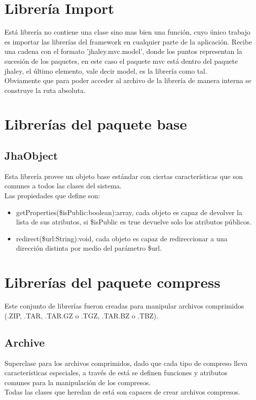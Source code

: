 \section{Librer\'ia Import}
Est\'a librer\'ia no contiene una clase sino mas bien una funci\'on, cuyo \'unico trabajo es importar las librer\'ias del framework en cualquier parte de la aplicaci\'on. Recibe una cadena con el formato \textsf{'jhaley.mvc.model'}, donde los puntos representan la sucesi\'on de los paquetes, en este caso el paquete \textsf{mvc} est\'a dentro del paquete \textsf{jhaley}, el \'ultimo elemento, vale decir \textsf{model}, es la librer\'ia como tal.\\
Obviamente que para poder acceder al archivo de la librer\'ia de manera interna se construye la ruta absoluta.

\section{Librer\'ias del paquete \textsf{base}}
\subsection{JhaObject}
Esta librer\'ia provee un objeto base est\'andar con ciertas caracter\'isticas que son comunes a todos las clases del sistema.\\Las propiedades que define son: 
\begin{itemize}
\item \textsf{getProperties(\$isPublic:boolean):array}, cada objeto es capaz de devolver la lista de sus atributos, si \textsf{\$isPublic} es \textsf{true} devuelve solo los atributos p\'ublicos.
\item \textsf{redirect(\$url:String):void}, cada objeto es capaz de redireccionar a una direcci\'on distinta por medio del par\'ametro \textsf{\$url}.
\end{itemize}

\section{Librer\'ias del paquete \textsf{compress}}
Este conjunto de librer\'ias fueron creadas para manipular archivos comprimidos (.ZIP, .TAR, .TAR.GZ o .TGZ, .TAR.BZ o .TBZ).
\subsection{Archive}
Superclase para los archivos comprimidos, dado que cada tipo de compreso lleva caracter\'isticas especiales, a trav\'es de est\'a se definen funciones y atributos comunes para la manipulaci\'on de los compresos.\\Todas las clases que heredan de est\'a son capaces de crear archivos compresos.
